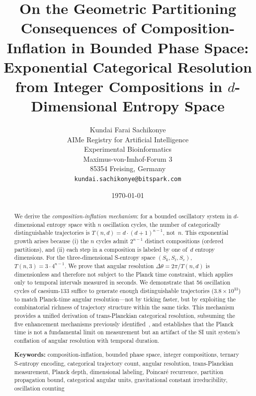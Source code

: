 \documentclass[twocolumn,10pt,a4paper]{article}
\theoremstyle{definition}
\theoremstyle{remark}
\newcommand{\Sk}{S_k}
\newcommand{\St}{S_t}
\newcommand{\Se}{S_e}
\begin{document}
\title{\textbf{On the Geometric Partitioning Consequences of Composition-Inflation in Bounded Phase Space: Exponential Categorical Resolution from Integer Compositions in $d$-Dimensional Entropy Space}}

\author{
Kundai Farai Sachikonye\\
AIMe Registry for Artificial Intelligence\\
Experimental Bioinformatics\\
Maximus-von-Imhof-Forum 3\\
85354 Freising, Germany\\
\texttt{kundai.sachikonye@bitspark.com}
}

\date{\today}

\maketitle


\begin{abstract}
\noindent We derive the \emph{composition-inflation mechanism}: for a bounded oscillatory system in $d$-dimensional entropy space with $n$ oscillation cycles, the number of categorically distinguishable trajectories is $T(n,d) = d \cdot (d+1)^{n-1}$, not~$n$. This exponential growth arises because (i) the $n$ cycles admit $2^{n-1}$ distinct compositions (ordered partitions), and (ii) each step in a composition is labeled by one of~$d$ entropy dimensions. For the three-dimensional S-entropy space $(\Sk, \St, \Se)$, $T(n,3) = 3 \cdot 4^{n-1}$. We prove that angular resolution $\Delta\theta = 2\pi / T(n,d)$ is dimensionless and therefore not subject to the Planck time constraint, which applies only to temporal intervals measured in seconds. We demonstrate that 56 oscillation cycles of caesium-133 suffice to generate enough distinguishable trajectories ($3.8 \times 10^{33}$) to match Planck-time angular resolution---not by ticking faster, but by exploiting the combinatorial richness of trajectory structure within the same ticks. This mechanism provides a unified derivation of trans-Planckian categorical resolution, subsuming the five enhancement mechanisms previously identified~\cite{sachikonye2025trans}, and establishes that the Planck time is not a fundamental limit on measurement but an artifact of the SI unit system's conflation of angular resolution with temporal duration.

\medskip
\noindent\textbf{Keywords:} composition-inflation, bounded phase space, integer compositions, ternary S-entropy encoding, categorical trajectory count, angular resolution, trans-Planckian measurement, Planck depth, dimensional labeling, Poincaré recurrence, partition propagation bound, categorical angular units, gravitational constant irreducibility, oscillation counting

\end{abstract}
\end{document}
